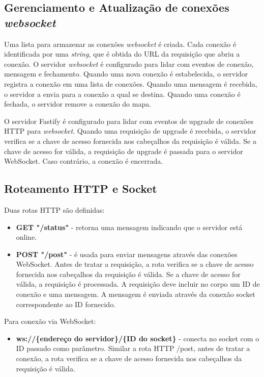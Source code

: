 \subsection{Gerenciamento e Atualização de conexões \textit{websocket}} Uma lista para armazenar as conexões \textit{websocket} é criada. Cada conexão é identificada por uma \textit{string}, que é obtida do URL da requisição que abriu a conexão. O servidor \textit{websocket} é configurado para lidar com eventos de conexão, mensagem e fechamento. Quando uma nova conexão é estabelecida, o servidor registra a conexão em uma lista de conexões. Quando uma mensagem é recebida, o servidor a envia para a conexão a qual se destina. Quando uma conexão é fechada, o servidor remove a conexão do mapa.

O servidor Fastify é configurado para lidar com eventos de upgrade de conexões HTTP para \textit{websocket}. Quando uma requisição de upgrade é recebida, o servidor verifica se a chave de acesso fornecida nos cabeçalhos da requisição é válida. Se a chave de acesso for válida, a requisição de upgrade é passada para o servidor WebSocket. Caso contrário, a conexão é encerrada.

\subsection{Roteamento HTTP e Socket} 

Duas rotas HTTP são definidas:

\begin{itemize}
    \item \textbf{GET "/status"} - retorna uma mensagem indicando que o servidor está online.
    \item \textbf{POST "/post"} - é usada para enviar mensagens através das conexões WebSocket. Antes de tratar a requisição, a rota verifica se a chave de acesso fornecida nos cabeçalhos da requisição é válida. Se a chave de acesso for válida, a requisição é processada. A requisição deve incluir no corpo um ID de conexão e uma mensagem. A mensagem é enviada através da conexão socket correspondente ao ID fornecido.
\end{itemize}

Para conexão via WebSocket:
\begin{itemize}
    \item \textbf{ws://\{endereço do servidor\}/\{ID do socket\}} - conecta no socket com o ID passado como parâmetro. Similar a rota HTTP /post, antes de tratar a conexão, a rota verifica se a chave de acesso fornecida nos cabeçalhos da requisição é válida.
\end{itemize}

